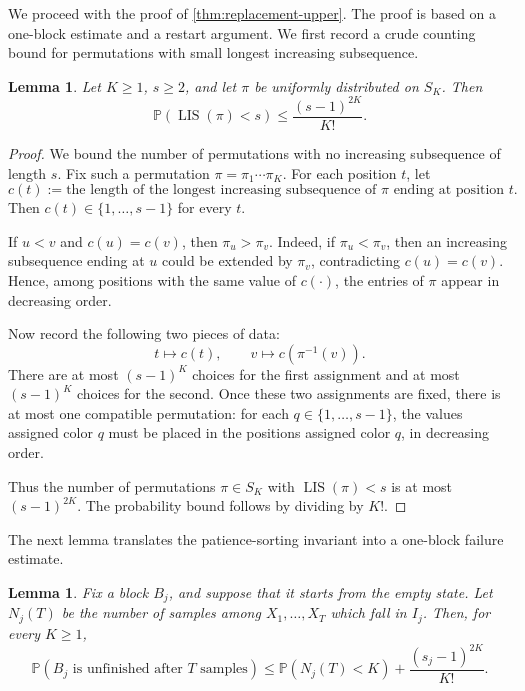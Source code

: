 \documentclass[11pt,reqno,letterpaper]{amsart}
\newtheorem{lemma}[theorem]{Lemma}
\theoremstyle{definition}
\numberwithin{equation}{section}
\renewcommand{\P}{\mathbb{P}}
\DeclareMathOperator{\LIS}{LIS}
\begin{document}
\medskip

We proceed with the proof of \cref{thm:replacement-upper}. The proof is based on a one-block estimate and a restart argument.  We first record a crude counting bound for permutations with small longest increasing subsequence.

\begin{lemma}\label{lem:counting}
Let \(K\ge1\), \(s\ge2\), and let \(\pi\) be uniformly distributed on \(S_K\). Then
\[
\P(\LIS(\pi)<s)\le \frac{(s-1)^{2K}}{K!}.
\]
\end{lemma}

\begin{proof}
We bound the number of permutations with no increasing subsequence of length \(s\). Fix such a permutation \(\pi=\pi_1\cdots\pi_K\). For each position \(t\), let
\[
c(t):=\text{the length of the longest increasing subsequence of \(\pi\) ending at position \(t\)}.
\]
Then \(c(t)\in\{1,\dots,s-1\}\) for every \(t\).

If \(u<v\) and \(c(u)=c(v)\), then \(\pi_u>\pi_v\). Indeed, if \(\pi_u<\pi_v\), then an increasing subsequence ending at \(u\) could be extended by \(\pi_v\), contradicting \(c(u)=c(v)\). Hence, among positions with the same value of \(c(\cdot)\), the entries of \(\pi\) appear in decreasing order.

Now record the following two pieces of data:
\[
t\mapsto c(t),
\qquad
v\mapsto c(\pi^{-1}(v)).
\]
There are at most \((s-1)^K\) choices for the first assignment and at most \((s-1)^K\) choices for the second. Once these two assignments are fixed, there is at most one compatible permutation: for each \(q\in\{1,\dots,s-1\}\), the values assigned color \(q\) must be placed in the positions assigned color \(q\), in decreasing order.

Thus the number of permutations \(\pi\in S_K\) with \(\LIS(\pi)<s\) is at most \((s-1)^{2K}\). The probability bound follows by dividing by \(K!\).
\end{proof}

The next lemma translates the patience-sorting invariant into a one-block failure estimate.

\begin{lemma}\label{lem:one-block-discrete}
Fix a block \(B_j\), and suppose that it starts from the empty state. Let \(N_j(T)\) be the number of samples among \(X_1,\dots,X_T\) which fall in \(I_j\). Then, for every \(K\ge1\),
\[
\P(\text{\(B_j\) is unfinished after \(T\) samples})
\le
\P(N_j(T)<K)+\frac{(s_j-1)^{2K}}{K!}.
\]
\end{lemma}
\end{document}
